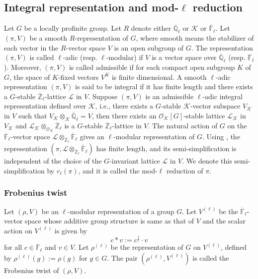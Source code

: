 \documentclass[10pt, reqno]{amsart}
\theoremstyle{plain}
\numberwithin{equation}{section}
\begin{document}
\subsection{Integral representation and mod-$\ell$ reduction}
Let $G$ be a locally profinite group. Let $R$ denote either $\overline{\mathbb{Q}}_\ell$ or $\mathcal{K}$ or $\overline{\mathbb{F}}_\ell$. Let $(\pi,V)$ be a smooth $R$-representation of $G$, where smooth means the stabilizer of each vector in the $R$-vector space $V$ is an open subgroup of $G$. The representation $(\pi,V)$ is called $\ell$-adic (resp. $\ell$-modular) if $V$ is a vector space over $\overline{\mathbb{Q}}_\ell$ (resp. $\overline{\mathbb{F}}_\ell$). Moreover, $(\pi,V)$ is called admissible if for each compact open subgroup $K$ of $G$, the space of $K$-fixed vectors $V^K$ is finite dimensional. A smooth $\ell$-adic representation $(\pi,V)$ is said to be integral if it has finite length and there exists a $G$-stable $\overline{\mathbb{Z}}_\ell$-lattice $\mathcal{L}$ in $V$. Suppose $(\pi,V)$ is an admissible $\ell$-adic 
integral representation defined over $\mathcal{K}$, i.e., there
exists a $G$-stable $\mathcal{K}$-vector subspace $V_{\mathcal{K}}$ in $V$ such
that $V_{\mathcal{K}}\otimes_{\mathcal{K}} \overline{\mathbb{Q}}_\ell = V$, then
there exists an $\mathcal{O}_{\mathcal{K}}[G]$-stable lattice $\mathcal{L}_{\mathcal{K}}$ in $V_{\mathcal{K}}$
and $\mathcal{L}_{\mathcal{K}} \otimes_{\mathcal{O}_{\mathcal{K}}}
\overline{\mathbb{Z}}_\ell$ is a
$G$-stable $\overline {\mathbb{Z}}_\ell$-lattice in $V$. The natural action of $G$ on the $\overline{\mathbb{F}}_\ell$-vector space $\mathcal{L}\otimes_{\overline{\mathbb{Z}}_\ell}
\overline{\mathbb{F}}_\ell$ gives an $\ell$-modular representation of $G$.
Using \cite[Chapter 2, 5.11a - 5.11.b]{Vigneras_modl_book}, the representation $(\pi,\mathcal{L}\otimes_{\overline
{\mathbb{Z}}_\ell}\overline{\mathbb{F}}_\ell)$ has finite length, and its semi-simplification is independent of the choice of the $G$-invariant lattice $\mathcal{L}$ in $V$. We denote this semi-simplification by $r_\ell(\pi)$, and it is called the mod-$\ell$ reduction of $\pi$. 
\subsubsection{Frobenius twist}
Let $(\rho,V)$ be an $\ell$-modular representation of a group $G$. Let $V^{(\ell)}$ be the $\overline{\mathbb{F}}_\ell$-vector space whose additive group structure is same as that of $V$ and the scalar action on $V^{(\ell)}$ is given by 
$$ c\ast v := c^{\frac{1}{\ell}}\cdot v $$
for all $c\in \overline{\mathbb{F}}_\ell$ and $v\in V$. Let $\rho^{(\ell)}$ be the representation of $G$ on $V^{(\ell)}$, defined by $\rho^{(\ell)}(g):=\rho(g)$ for $g\in G$. The pair $(\rho^{(\ell)}, V^{(\ell)})$ is called the Frobenius twist of $(\rho,V)$.
\end{document}
